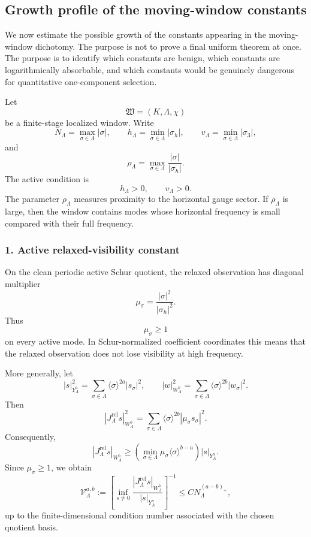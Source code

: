 \documentclass[11pt]{article}
\numberwithin{equation}{section}
\begin{document}
\subsection{Growth profile of the moving-window constants}

We now estimate the possible growth of the constants appearing in the moving-window dichotomy. The purpose is not to prove a final uniform theorem at once. The purpose is to identify which constants are benign, which constants are logarithmically absorbable, and which constants would be genuinely dangerous for quantitative one-component selection.

Let
\[
\mathfrak W=(K,\Lambda,\chi)
\]
be a finite-stage localized window. Write
\[
N_\Lambda=\max_{\sigma\in\Lambda}|\sigma|,
\qquad
h_\Lambda=\min_{\sigma\in\Lambda}|\sigma_h|,
\qquad
v_\Lambda=\min_{\sigma\in\Lambda}|\sigma_3|,
\]
and
\[
\rho_\Lambda =
\max_{\sigma\in\Lambda}
\frac{|\sigma|}{|\sigma_h|}.
\]
The active condition is
\[
h_\Lambda>0,\qquad v_\Lambda>0.
\]
The parameter \(\rho_\Lambda\) measures proximity to the horizontal gauge sector. If \(\rho_\Lambda\) is large, then the window contains modes whose horizontal frequency is small compared with their full frequency.

\subsubsection*{1. Active relaxed-visibility constant}

On the clean periodic active Schur quotient, the relaxed observation has diagonal multiplier
\[
\mu_\sigma =
\frac{|\sigma|^2}{|\sigma_h|^2}.
\]
Thus
\[
\mu_\sigma\ge 1
\]
on every active mode. In Schur-normalized coefficient coordinates this means that the relaxed observation does not lose visibility at high frequency.

More generally, let
\[
|s|_{Y_\Lambda^a}^2 =
\sum_{\sigma\in\Lambda}
\langle\sigma\rangle^{2a}|s_\sigma|^2,
\qquad
|w|_{W_\Lambda^b}^2 =
\sum_{\sigma\in\Lambda}
\langle\sigma\rangle^{2b}|w_\sigma|^2.
\]
Then
\[
|J_\Lambda^{\mathrm{rel}}s|_{W_\Lambda^b}^2 =
\sum_{\sigma\in\Lambda}
\langle\sigma\rangle^{2b}
|\mu_\sigma s_\sigma|^2.
\]
Consequently,
\[
|J_\Lambda^{\mathrm{rel}}s|_{W_\Lambda^b}
\ge
\left(
\min_{\sigma\in\Lambda}
\mu_\sigma\langle\sigma\rangle^{b-a}
\right)
|s|_{Y_\Lambda^a}.
\]
Since \(\mu_\sigma\ge1\), we obtain
\[
\mathcal V_\Lambda^{a,b}
:=
\left[
\inf_{s\ne0}
\frac{|J_\Lambda^{\mathrm{rel}}s|_{W_\Lambda^b}}
{|s|_{Y_\Lambda^a}}
\right]^{-1}
\le
C N_\Lambda^{(a-b)_+},
\]
up to the finite-dimensional condition number associated with the chosen quotient basis.
\end{document}
